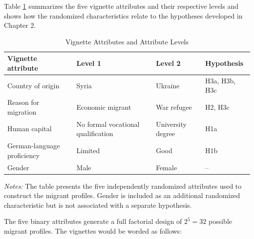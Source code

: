 Table \ref{tab:vignette_attributes} summarizes the five vignette attributes and their respective levels and shows how 
the randomized characteristics relate to the hypotheses developed in Chapter 2.
\begin{table}[H]
\centering

\caption{Vignette Attributes and Attribute Levels}
\label{tab:vignette_attributes}

\small

\begin{tabularx}{\textwidth}{
    >{\raggedright\arraybackslash}p{3.3cm}
    >{\raggedright\arraybackslash}X
    >{\raggedright\arraybackslash}X
    >{\raggedright\arraybackslash}p{2.5cm}
}
\toprule

\textbf{Vignette attribute} &
\textbf{Level 1} &
\textbf{Level 2} &
\textbf{Hypothesis} \\

\midrule

Country of origin &
Syria &
Ukraine &
H3a, H3b, H3c \\

\addlinespace

Reason for migration &
Economic migrant &
War refugee &
H2, H3c \\

\addlinespace

Human capital &
No formal vocational qualification &
University degree &
H1a \\

\addlinespace

German-language proficiency &
Limited &
Good &
H1b \\

\addlinespace

Gender &
Male &
Female &
-- \\

\bottomrule
\end{tabularx}

\vspace{0.5em}

\begin{minipage}{\textwidth}
\footnotesize
\textit{Notes:} The table presents the five independently randomized attributes used to construct the migrant profiles. Gender is included as an additional randomized characteristic but is not associated with a separate hypothesis.
\end{minipage}

\end{table}
The five binary attributes generate a full factorial design of \(2^5=32\) possible migrant profiles.
The vignettes would be worded as follows:

